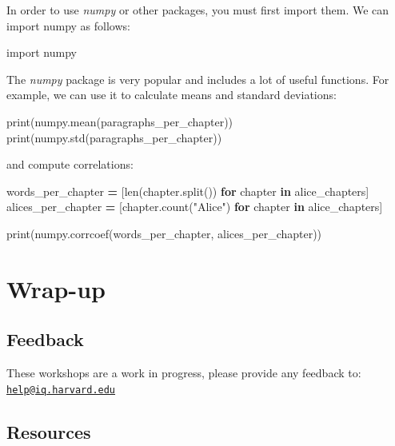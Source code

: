 \documentclass[]{book}
\newenvironment{Shaded}{\begin{snugshade}}{\end{snugshade}}
\newcommand{\KeywordTok}[1]{\textcolor[rgb]{0.13,0.29,0.53}{\textbf{#1}}}
\newcommand{\StringTok}[1]{\textcolor[rgb]{0.31,0.60,0.02}{#1}}
\newcommand{\ImportTok}[1]{#1}
\newcommand{\ControlFlowTok}[1]{\textcolor[rgb]{0.13,0.29,0.53}{\textbf{#1}}}
\newcommand{\OperatorTok}[1]{\textcolor[rgb]{0.81,0.36,0.00}{\textbf{#1}}}
\newcommand{\BuiltInTok}[1]{#1}
\newcommand{\NormalTok}[1]{#1}
\begin{document}
In order to use \emph{numpy} or other packages, you must first import
them. We can import numpy as follows:

\begin{Shaded}
\begin{Highlighting}[]
\ImportTok{import}\NormalTok{ numpy}
\end{Highlighting}
\end{Shaded}

The \emph{numpy} package is very popular and includes a lot of useful
functions. For example, we can use it to calculate means and standard
deviations:

\begin{Shaded}
\begin{Highlighting}[]
\BuiltInTok{print}\NormalTok{(numpy.mean(paragraphs_per_chapter))}
\BuiltInTok{print}\NormalTok{(numpy.std(paragraphs_per_chapter))}
\end{Highlighting}
\end{Shaded}

and compute correlations:

\begin{Shaded}
\begin{Highlighting}[]
\NormalTok{words_per_chapter }\OperatorTok{=}\NormalTok{ [}\BuiltInTok{len}\NormalTok{(chapter.split()) }\ControlFlowTok{for}\NormalTok{ chapter }\KeywordTok{in}\NormalTok{ alice_chapters]}
\NormalTok{alices_per_chapter }\OperatorTok{=}\NormalTok{ [chapter.count(}\StringTok{"Alice"}\NormalTok{) }\ControlFlowTok{for}\NormalTok{ chapter }\KeywordTok{in}\NormalTok{ alice_chapters]}

\BuiltInTok{print}\NormalTok{(numpy.corrcoef(words_per_chapter, alices_per_chapter))}
\end{Highlighting}
\end{Shaded}

\section{Wrap-up}\label{wrap-up-5}

\subsection{Feedback}\label{feedback-5}

These workshops are a work in progress, please provide any feedback to:
\href{mailto:help@iq.harvard.edu}{\nolinkurl{help@iq.harvard.edu}}

\subsection{Resources}\label{resources-5}
\end{document}
